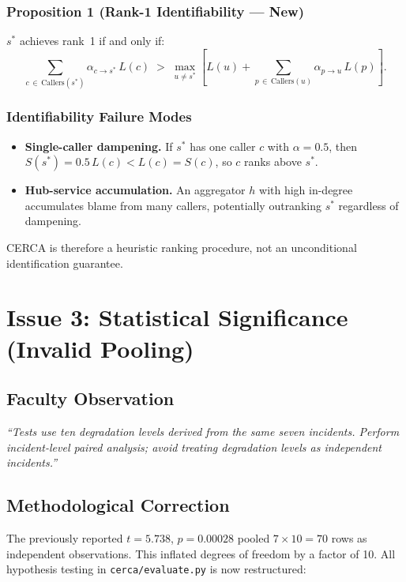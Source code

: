 \documentclass[11pt,a4paper]{article}
\begin{document}
\subsubsection{Proposition 1 (Rank-1 Identifiability --- New)}
$s^*$ achieves rank~1 if and only if:
\[
  \sum_{c\,\in\,\mathrm{Callers}(s^*)} \alpha_{c\to s^*}\,L(c)
  \;>\;
  \max_{u\ne s^*}\!\left[L(u) + \sum_{p\,\in\,\mathrm{Callers}(u)} \alpha_{p\to u}\,L(p)\right].
\]

\subsubsection{Identifiability Failure Modes}
\begin{itemize}[leftmargin=1.5em,itemsep=2pt]
  \item \textbf{Single-caller dampening.} If $s^*$ has one caller $c$ with $\alpha=0.5$, then $S(s^*)=0.5\,L(c)<L(c)=S(c)$, so $c$ ranks above $s^*$.
  \item \textbf{Hub-service accumulation.} An aggregator $h$ with high in-degree accumulates blame from many callers, potentially outranking $s^*$ regardless of dampening.
\end{itemize}

CERCA is therefore a heuristic ranking procedure, not an unconditional identification guarantee.

\section{Issue 3: Statistical Significance (Invalid Pooling)}

\subsection{Faculty Observation}
\textit{``Tests use ten degradation levels derived from the same seven incidents. Perform incident-level paired analysis; avoid treating degradation levels as independent incidents.''}

\subsection{Methodological Correction}
The previously reported $t=5.738$, $p=0.00028$ pooled $7\times10=70$ rows as independent observations. This inflated degrees of freedom by a factor of 10. All hypothesis testing in \texttt{cerca/evaluate.py} is now restructured:
\end{document}
